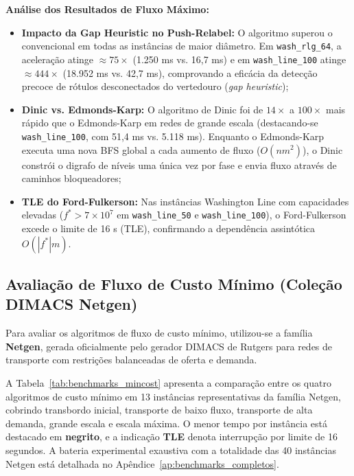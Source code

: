 \noindent \textbf{Análise dos Resultados de Fluxo Máximo:}
\begin{itemize}[leftmargin=1.5em, itemsep=0.15em, topsep=0.2em, parsep=0em]
    \item \textbf{Impacto da Gap Heuristic no Push-Relabel:} O algoritmo  superou o  convencional em todas as instâncias de maior diâmetro. Em \texttt{wash\_rlg\_64}, a aceleração atinge $\approx 75\times$ (1.250 ms vs. 16,7 ms) e em \texttt{wash\_line\_100} atinge $\approx 444\times$ (18.952 ms vs. 42,7 ms), comprovando a eficácia da detecção precoce de rótulos desconectados do vertedouro (\textit{gap heuristic});
    \item \textbf{Dinic vs. Edmonds-Karp:} O algoritmo de Dinic foi de $14\times$ a $100\times$ mais rápido que o Edmonds-Karp em redes de grande escala (destacando-se \texttt{wash\_line\_100}, com 51,4 ms vs. 5.118 ms). Enquanto o Edmonds-Karp executa uma nova BFS global a cada aumento de fluxo ($O(nm^2)$), o Dinic constrói o digrafo de níveis uma única vez por fase e envia fluxo através de caminhos bloqueadores;
    \item \textbf{TLE do Ford-Fulkerson:} Nas instâncias Washington Line com capacidades elevadas ($f^* > 7 \times 10^7$ em \texttt{wash\_line\_50} e \texttt{wash\_line\_100}), o Ford-Fulkerson excede o limite de 16 s (TLE), confirmando a dependência assintótica $O(|f^*| m)$.
\end{itemize}

\subsection{Avaliação de Fluxo de Custo Mínimo (Coleção DIMACS Netgen)}

Para avaliar os algoritmos de fluxo de custo mínimo, utilizou-se a família \textbf{Netgen}, gerada oficialmente pelo gerador DIMACS de Rutgers para redes de transporte com restrições balanceadas de oferta e demanda.

A Tabela~\ref{tab:benchmarks_mincost} apresenta a comparação entre os quatro algoritmos de custo mínimo em 13 instâncias representativas da família Netgen, cobrindo transbordo inicial, transporte de baixo fluxo, transporte de alta demanda, grande escala e escala máxima. O menor tempo por instância está destacado em \textbf{negrito}, e a indicação \textbf{TLE} denota interrupção por limite de 16 segundos. A bateria experimental exaustiva com a totalidade das 40 instâncias Netgen está detalhada no Apêndice~\ref{ap:benchmarks_completos}.

